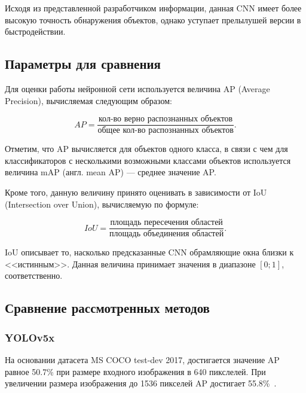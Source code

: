 Исходя из представленной разработчиком информации, данная CNN имеет более высокую точность обнаружения объектов, однако уступает прелылушей версии в быстродействии.




\subsection{Параметры для сравнения}

Для оценки работы нейронной сети используется величина AP (Average Precision), вычисляемая следующим образом:

\begin{equation}
	AP = \frac{\text{кол-во верно распознанных объектов}}{\text{общее кол-во распознанных объектов}}.
\end{equation}

Отметим, что AP вычисляется для объектов одного класса, в связи с чем для классификаторов с несколькими возможными классами объектов используется величина mAP (англ. mean AP) --- среднее значение AP.

Кроме того, данную величину принято оценивать в зависимости от IoU (Intersection over Union), вычисляемую по формуле:

\begin{equation}
	IoU = \frac{\text{площадь пересечения областей}}{\text{площадь объединения областей}}.
\end{equation}

IoU описывает то, насколько предсказанные CNN обрамляющие окна близки к <<истинным>>. Данная величина принимает значения в диапазоне $[0;1]$, соответственно.

\subsection{Сравнение рассмотренных методов}

\subsubsection*{YOLOv5x}

На основании датасета MS COCO test-dev 2017, достигается значение AP равное 50.7\% при размере входного изображения в 640 пикслелей. При увеличении размера изображения до 1536 пикселей AP достигает 55.8\%~\cite{yolo-review-2023}. 

